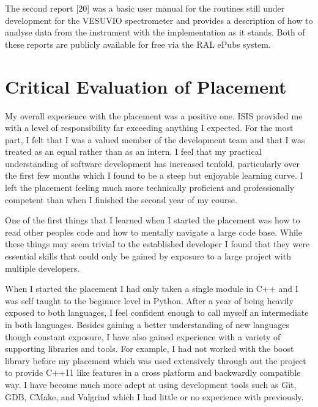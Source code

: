 \documentclass[paper=a4, fontsize=11pt]{scrartcl}	%
\numberwithin{equation}{section}															%
\numberwithin{figure}{section}																%
\numberwithin{table}{section}
\begin{document}
The second report {[}20{]} was a basic user manual for the routines still under
development for the VESUVIO spectrometer and provides a description of
how to analyse data from the instrument with the implementation as it
stands. Both of these reports are publicly available for free via the RAL ePubs system.

\section{Critical Evaluation of
Placement}\label{critical-evaluation-of-placement}

My overall experience with the placement was a positive one. ISIS provided me with a level of responsibility far exceeding
anything I expected. For the most part, I felt that I was a valued member
of the development team and that I was treated as an equal rather than
as an intern. I feel that my practical understanding of software
development has increased tenfold, particularly over the first few
months which I found to be a steep but enjoyable learning curve. I left
the placement feeling much more technically proficient and
professionally competent than when I finished the second year of my
course.

One of the first things that I learned when I started the placement was
how to read other peoples code and how to mentally navigate a large code
base. While these things may seem trivial to the established developer I
found that they were essential skills that could only be gained by
exposure to a large project with multiple developers.

When I started the placement I had only taken a single module in C++ and
I was self taught to the beginner level in Python. After a year of being
heavily exposed to both languages, I feel confident enough to call
myself an intermediate in both languages. Besides gaining a better
understanding of new languages though constant exposure, I have also
gained experience with a variety of supporting libraries and tools. For
example, I had not worked with the boost library before my placement
which was used extensively through out the project to provide C++11 like
features in a cross platform and backwardly compatible way. I have become much more adept at using
development tools such as Git, GDB, CMake, and Valgrind which I had
little or no experience with previously.
\end{document}
